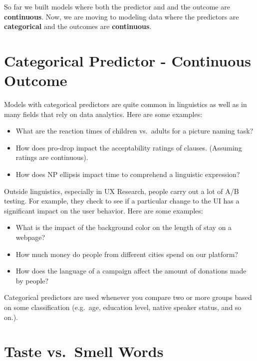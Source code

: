 \documentclass[
]{book}
\providecommand{\tightlist}{%
  \setlength{\itemsep}{0pt}\setlength{\parskip}{0pt}}
\begin{document}
So far we built models where both the predictor and and the outcome are \textbf{continuous}. Now, we are moving to modeling data where the predictors are \textbf{categorical} and the outcomes are \textbf{continuous}.

\hypertarget{categorical-predictor---continuous-outcome}{%
\section{Categorical Predictor - Continuous Outcome}\label{categorical-predictor---continuous-outcome}}

Models with categorical predictors are quite common in linguistics as well as in many fields that rely on data analytics. Here are some examples:

\begin{itemize}
\tightlist
\item
  What are the reaction times of children vs.~adults for a picture naming task?
\item
  How does pro-drop impact the acceptability ratings of clauses. (Assuming ratings are continuous).
\item
  How does NP ellipsis impact time to comprehend a linguistic expression?
\end{itemize}

Outside linguistics, especially in UX Research, people carry out a lot of A/B testing. For example, they check to see if a particular change to the UI has a significant impact on the user behavior. Here are some examples:

\begin{itemize}
\tightlist
\item
  What is the impact of the background color on the length of stay on a webpage?
\item
  How much money do people from different cities spend on our platform?
\item
  How does the language of a campaign affect the amount of donations made by people?
\end{itemize}

Categorical predictors are used whenever you compare two or more groups based on some classification (e.g.~age, education level, native speaker status, and so on.).

\hypertarget{taste-vs.-smell-words}{%
\section{Taste vs.~Smell Words}\label{taste-vs.-smell-words}}
\end{document}
